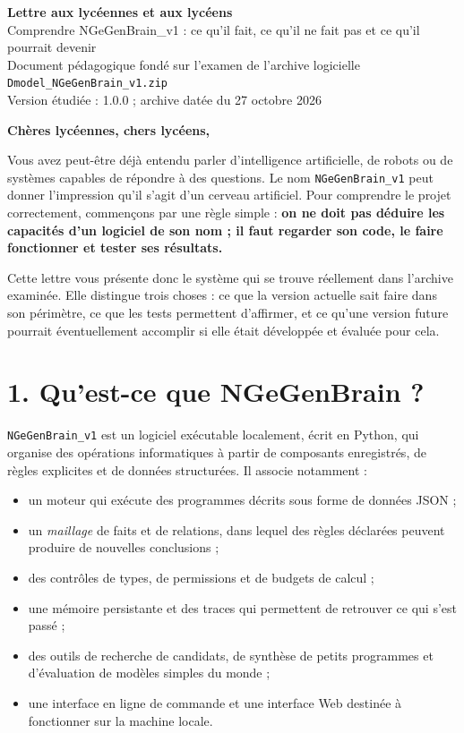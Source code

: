\documentclass[11pt,a4paper]{article}
\newcommand{\ngb}{\texttt{NGeGenBrain\_v1}}
\newcommand{\code}[1]{\texttt{\small #1}}
\newcommand{\important}[1]{\textbf{#1}}
\begin{document}
\begin{center}
  {\LARGE\bfseries Lettre aux lycéennes et aux lycéens}\\[0.4em]
  {\Large Comprendre NGeGenBrain\_v1 : ce qu'il fait, ce qu'il ne fait pas et ce qu'il pourrait devenir}\\[0.8em]
  {\normalsize Document pédagogique fondé sur l'examen de l'archive logicielle \code{Dmodel\_NGeGenBrain\_v1.zip}}\\
  {\small Version étudiée : 1.0.0 ; archive datée du 27 octobre 2026}
\end{center}

\vspace{0.5em}
\noindent\textbf{Chères lycéennes, chers lycéens,}

Vous avez peut-être déjà entendu parler d'intelligence artificielle, de robots ou de systèmes capables de répondre à des questions. Le nom \ngb{} peut donner l'impression qu'il s'agit d'un cerveau artificiel. Pour comprendre le projet correctement, commençons par une règle simple : \important{on ne doit pas déduire les capacités d'un logiciel de son nom ; il faut regarder son code, le faire fonctionner et tester ses résultats.}

Cette lettre vous présente donc le système qui se trouve réellement dans l'archive examinée. Elle distingue trois choses : ce que la version actuelle sait faire dans son périmètre, ce que les tests permettent d'affirmer, et ce qu'une version future pourrait éventuellement accomplir si elle était développée et évaluée pour cela.

\section*{1. Qu'est-ce que NGeGenBrain ?}

\ngb{} est un logiciel exécutable localement, écrit en Python, qui organise des opérations informatiques à partir de composants enregistrés, de règles explicites et de données structurées. Il associe notamment :
\begin{itemize}
  \item un moteur qui exécute des programmes décrits sous forme de données JSON ;
  \item un \emph{maillage} de faits et de relations, dans lequel des règles déclarées peuvent produire de nouvelles conclusions ;
  \item des contrôles de types, de permissions et de budgets de calcul ;
  \item une mémoire persistante et des traces qui permettent de retrouver ce qui s'est passé ;
  \item des outils de recherche de candidats, de synthèse de petits programmes et d'évaluation de modèles simples du monde ;
  \item une interface en ligne de commande et une interface Web destinée à fonctionner sur la machine locale.
\end{itemize}
\end{document}
